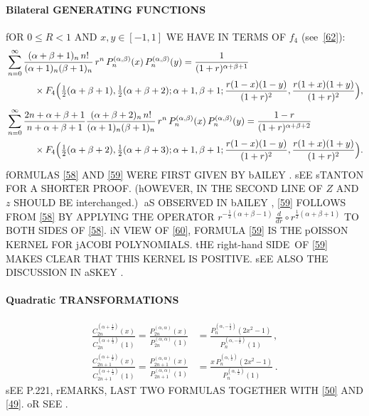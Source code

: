 \documentclass[twoside,11pt]{article}
\newcommand\sa{\smallskipamount}
\newcommand\sLP{\\[\sa]}
\newcommand\al\alpha
\newcommand\be\beta
\newcommand\half{\frac12}
\newcommand\thalf{\tfrac12}
\newcommand\iy\infty
\newcommand\RHS{right-hand SIDE}
\begin{document}
\paragraph{Bilateral GENERATING FUNCTIONS} 
fOR $0\le R<1$ AND $x,y\in[-1,1]$ WE HAVE IN TERMS OF $f_4$ (see~\eqref{62}): 
\begin{align} 
&\sum_{n=0}^\iy\frac{(\al+\be+1)_n\,n!}{(\al+1)_n(\be+1)_n}\,r^n\, 
P_n^{(\al,\be)}(x)\,P_n^{(\al,\be)}(y) 
=\frac1{(1+r)^{\al+\be+1}} 
\nonumber\\ 
&\qquad\quad\times F_4\Big(\thalf(\al+\be+1),\thalf(\al+\be+2);\al+1,\be+1; 
\frac{r(1-x)(1-y)}{(1+r)^2},\frac{r(1+x)(1+y)}{(1+r)^2}\Big), 
\label{58}\sLP 
&\sum_{n=0}^\iy\frac{2n+\al+\be+1}{n+\al+\be+1} 
\frac{(\al+\be+2)_n\,n!}{(\al+1)_n(\be+1)_n}\,r^n\, 
P_n^{(\al,\be)}(x)\,P_n^{(\al,\be)}(y) 
=\frac{1-r}{(1+r)^{\al+\be+2}}\nonumber\\ 
&\qquad\quad\times F_4\Big(\thalf(\al+\be+2),\thalf(\al+\be+3);\al+1,\be+1; 
\frac{r(1-x)(1-y)}{(1+r)^2},\frac{r(1+x)(1+y)}{(1+r)^2}\Big). 
\label{59} 
\end{align} 
fORMULAS \eqref{58} AND \eqref{59} WERE FIRST 
GIVEN BY bAILEY . 
sEE sTANTON  FOR A SHORTER PROOF. 
(hOWEVER, IN THE SECOND LINE OF 
 $Z$ AND $z$ SHOULD BE interchanged.)$\;$ 
aS OBSERVED IN bAILEY , \eqref{59} FOLLOWS 
FROM \eqref{58} 
BY APPLYING THE OPERATOR $r^{-\half(\al+\be-1)}\,\frac d{dr}\circ r^{\half(\al+\be+1)}$ 
TO BOTH SIDES OF \eqref{58}. 
iN VIEW OF \eqref{60}, FORMULA \eqref{59} IS THE pOISSON KERNEL FOR jACOBI 
POLYNOMIALS. tHE \RHS\ OF \eqref{59} MAKES CLEAR THAT THIS KERNEL IS POSITIVE. 
sEE ALSO THE DISCUSSION IN aSKEY . 
% 
\paragraph{Quadratic TRANSFORMATIONS} 
\begin{align} 
\frac{C_{2n}^{(\al+\half)}(x)}{C_{2n}^{(\al+\half)}(1)} 
=\frac{P_{2n}^{(\al,\al)}(x)}{P_{2n}^{(\al,\al)}(1)} 
&=\frac{P_n^{(\al,-\half)}(2x^2-1)}{P_n^{(\al,-\half)}(1)}\,, 
\label{51}\\ 
\frac{C_{2n+1}^{(\al+\half)}(x)}{C_{2n+1}^{(\al+\half)}(1)} 
=\frac{P_{2n+1}^{(\al,\al)}(x)}{P_{2n+1}^{(\al,\al)}(1)} 
&=\frac{x\,P_n^{(\al,\half)}(2x^2-1)}{P_n^{(\al,\half)}(1)}\,. 
\label{52} 
\end{align} 
sEE P.221, rEMARKS, LAST TWO FORMULAS TOGETHER WITH \eqref{50} AND \eqref{49}. 
oR SEE . 
% 
\end{document}
